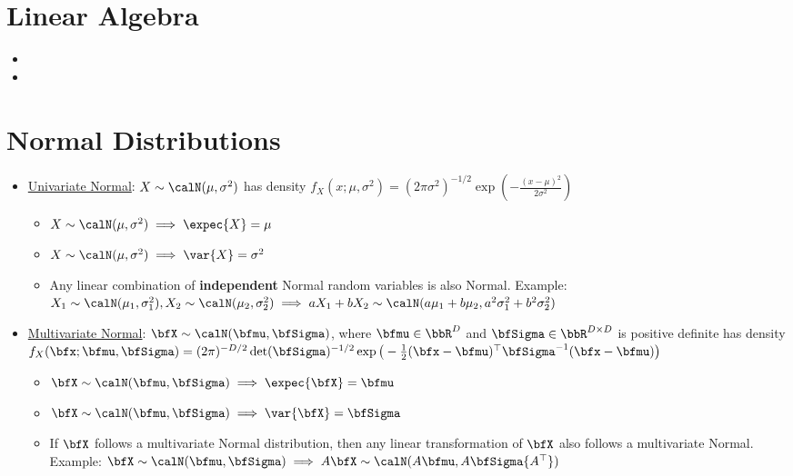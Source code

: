 \documentclass[11pt]{article}
\begin{document}
 
\section{Linear Algebra}
\begin{itemize}[label = , itemsep = -3pt, topsep = -10pt, leftmargin = *]
  \item 
  \item 
\end{itemize}

\section{Normal Distributions}
\begin{itemize}[label = , itemsep = -3pt, topsep = -10pt, leftmargin = *]

  \item 
  \underline{Univariate Normal}: $X \sim \calN(\mu, \sigma^2)$ has density $f_{X}(x; \mu, \sigma^2) = (2\pi\sigma^{2})^{-1/2}\exp(-\frac{(x-\mu)^2}{2\sigma^2})$
  \begin{itemize}[label = , itemsep = -2pt, topsep = -10pt]
    \item $X \sim \calN(\mu, \sigma^2) \implies \expec{X} = \mu$ 
    \item $X \sim \calN(\mu, \sigma^2) \implies \var{X} = \sigma^2$ 
    \item
    Any linear combination of \textbf{independent} Normal random variables is also Normal. Example:\\ $X_{1} \sim \calN(\mu_{1}, \sigma^{2}_{1}), X_{2} \sim \calN(\mu_{2}, \sigma^{2}_{2}) \implies aX_{1} + bX_{2} \sim \calN(a\mu_{1} + b\mu_{2}, a^{2}\sigma_{1}^{2} + b^2\sigma_{2}^{2})$
  \end{itemize}
  
  \item 
  \underline{Multivariate Normal}: $\bfX \sim \calN(\bfmu, \bfSigma)$, where $\bfmu \in \bbR^{D}$ and $\bfSigma \in \bbR^{D \times D}$ is positive definite has density $f_{X}(\bfx; \bfmu, \bfSigma) = (2\pi)^{-D/2}\det(\bfSigma)^{-1/2}\exp\big(-\frac{1}{2}(\bfx - \bfmu)^{\top}\bfSigma^{-1}(\bfx - \bfmu)\big)$
  \begin{itemize}[label = , itemsep = -2pt, topsep = -10pt]
    \item $\bfX \sim \calN(\bfmu, \bfSigma) \implies \expec{\bfX} = \bfmu$ 
    \item $\bfX \sim \calN(\bfmu, \bfSigma) \implies \var{\bfX} = \bfSigma$ 
    \item
    If $\bfX$ follows a multivariate Normal distribution, then any linear transformation of $\bfX$ also follows a multivariate Normal. Example: $\bfX \sim \calN(\bfmu, \bfSigma) \implies A\bfX \sim \calN(A\bfmu, A\bfSigma{A^{\top}})$
  \end{itemize}

\end{itemize}
\end{document}
